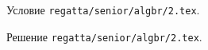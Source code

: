 Условие \texttt{regatta/senior/algbr/2.tex}.

\solution Решение \texttt{regatta/senior/algbr/2.tex}.
